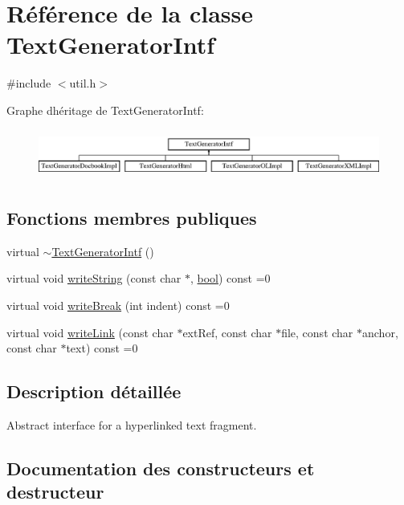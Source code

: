 \hypertarget{class_text_generator_intf}{}\section{Référence de la classe Text\+Generator\+Intf}
\label{class_text_generator_intf}


{\ttfamily \#include $<$util.\+h$>$}

Graphe d\textquotesingle{}héritage de Text\+Generator\+Intf\+:\begin{figure}[H]
\begin{center}
\leavevmode
\includegraphics[height=1.627907cm]{class_text_generator_intf}
\end{center}
\end{figure}
\subsection*{Fonctions membres publiques}
\begin{DoxyCompactItemize}
\item 
virtual \hyperlink{class_text_generator_intf_a1d8bb006c0d74515154f55506e5e0748}{$\sim$\+Text\+Generator\+Intf} ()
\item 
virtual void \hyperlink{class_text_generator_intf_a246866c847ad919b03a0178fadd43657}{write\+String} (const char $\ast$, \hyperlink{qglobal_8h_a1062901a7428fdd9c7f180f5e01ea056}{bool}) const  =0
\item 
virtual void \hyperlink{class_text_generator_intf_af4c3d22223809b86ddac1cfd7ee5dc69}{write\+Break} (int indent) const  =0
\item 
virtual void \hyperlink{class_text_generator_intf_a378305b6b281e7a96521d78a303e4763}{write\+Link} (const char $\ast$ext\+Ref, const char $\ast$file, const char $\ast$anchor, const char $\ast$text) const  =0
\end{DoxyCompactItemize}


\subsection{Description détaillée}
Abstract interface for a hyperlinked text fragment. 

\subsection{Documentation des constructeurs et destructeur}
\hypertarget{class_text_generator_intf_a1d8bb006c0d74515154f55506e5e0748}{}
